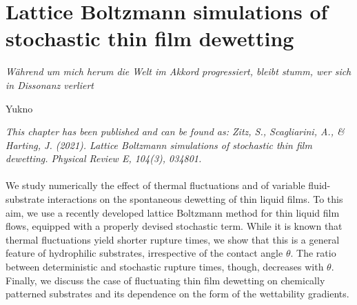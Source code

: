 \chapter{Lattice Boltzmann simulations of stochastic thin film dewetting}
\label{chapter:second_paper}
\epigraph{\textit{Während um mich herum die Welt im Akkord progressiert, bleibt stumm, wer sich in Dissonanz verliert}}{Yukno}

\textit{\small{This chapter has been published and can be found as: Zitz, S., Scagliarini, A., \& Harting, J. (2021). Lattice Boltzmann simulations of stochastic thin film dewetting. Physical Review E, 104(3), 034801.}}
\\
\\

We study numerically the effect of thermal fluctuations and of variable fluid-substrate interactions on the spontaneous dewetting of thin liquid films.
To this aim, we use a recently developed lattice Boltzmann method for thin liquid film flows, equipped with a properly devised stochastic term.
While it is known that thermal fluctuations yield shorter rupture times, we show that this is a general feature of hydrophilic substrates, irrespective of the contact angle $\theta$.
The ratio between deterministic and stochastic rupture times, though, decreases with $\theta$. 
Finally, we discuss the case of fluctuating thin film dewetting on chemically patterned substrates and its dependence on the form of the wettability gradients.

